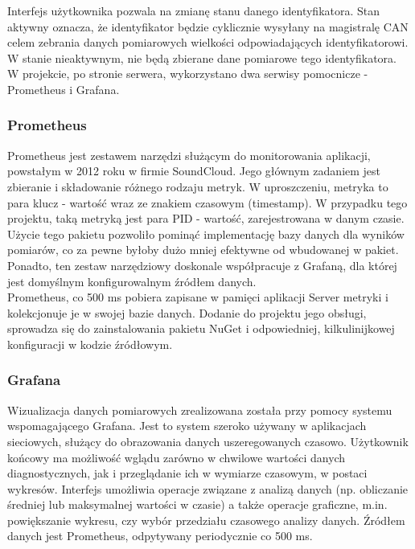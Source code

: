 \documentclass[10pt,a4paper]{scrartcl}
\begin{document}
		Interfejs użytkownika pozwala na zmianę stanu danego identyfikatora. Stan aktywny oznacza, że identyfikator będzie cyklicznie wysyłany na magistralę CAN celem zebrania danych pomiarowych wielkości odpowiadających identyfikatorowi. W stanie nieaktywnym, nie będą zbierane dane pomiarowe tego identyfikatora.\\		
		W projekcie, po stronie serwera, wykorzystano dwa serwisy pomocnicze - Prometheus i Grafana.
		
		\subsubsection{Prometheus}
		Prometheus jest zestawem narzędzi służącym do monitorowania aplikacji, powstałym w 2012 roku w firmie SoundCloud. Jego głównym zadaniem jest zbieranie i składowanie różnego rodzaju metryk. W uproszczeniu, metryka to para klucz - wartość wraz ze znakiem czasowym (timestamp). W przypadku tego projektu, taką metryką jest para PID - wartość, zarejestrowana w danym czasie. Użycie tego pakietu pozwoliło pominąć implementację bazy danych dla wyników pomiarów, co za pewne byłoby dużo mniej efektywne od wbudowanej w pakiet. Ponadto, ten zestaw narzędziowy doskonale współpracuje z Grafaną, dla której jest domyślnym konfigurowalnym źródłem danych.\\
		Prometheus, co 500 ms pobiera zapisane w pamięci aplikacji Server metryki i kolekcjonuje je w swojej bazie danych. Dodanie do projektu jego obsługi, sprowadza się do zainstalowania pakietu NuGet i odpowiedniej, kilkulinijkowej konfiguracji w kodzie źródłowym.
		
		\subsubsection{Grafana}
		Wizualizacja danych pomiarowych zrealizowana została przy pomocy systemu wspomagającego Grafana. Jest to system szeroko używany w aplikacjach sieciowych, służący do obrazowania danych uszeregowanych czasowo. Użytkownik końcowy ma możliwość wglądu zarówno w chwilowe wartości danych diagnostycznych, jak i przeglądanie ich w wymiarze czasowym, w postaci wykresów. Interfejs umożliwia operacje związane z analizą danych (np. obliczanie średniej lub maksymalnej wartości w czasie) a także operacje graficzne, m.in. powiększanie wykresu, czy wybór przedziału czasowego analizy danych. Źródłem danych jest Prometheus, odpytywany periodycznie co 500 ms.
		
\end{document}
